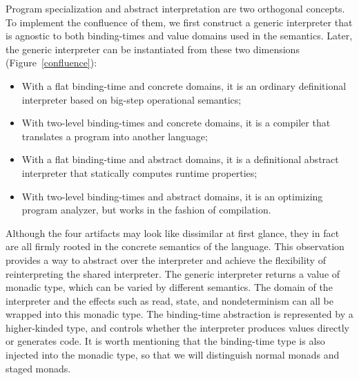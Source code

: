 Program specialization and abstract interpretation are two orthogonal
concepts.  To implement the confluence of them, we first construct a
generic interpreter that is agnostic to both binding-times and value
domains used in the semantics.  Later, the generic interpreter can be
instantiated from these two dimensions (Figure~\ref{confluence}):
\begin{itemize}
\item With a flat binding-time and concrete domains, it is an ordinary
  definitional interpreter based on big-step operational semantics;
\item With two-level binding-times and concrete domains, it is a
  compiler that translates a program into another language;
\item With a flat binding-time and abstract domains, it is a
  definitional abstract interpreter \cite{DBLP:journals/pacmpl/DaraisLNH17}
  that statically computes runtime properties;
\item With two-level binding-times and abstract domains, it is an optimizing
  program analyzer, but works in the fashion of compilation.
\end{itemize}

Although the four artifacts may look like dissimilar at first glance, they in
fact are all firmly rooted in the concrete semantics of the language.  This
observation provides a way to abstract over the interpreter and achieve the
flexibility of reinterpreting the shared interpreter.  The generic interpreter
returns a value of monadic type, which can be varied by different semantics.
The domain of the interpreter and the effects such as read, state, and
nondeterminism can all be wrapped into this monadic type.  The binding-time
abstraction is represented by a higher-kinded type, and controls whether the
interpreter produces values directly or generates code. It is worth mentioning
that the binding-time type is also injected into the monadic type, so that we
will distinguish normal monads and staged monads.


